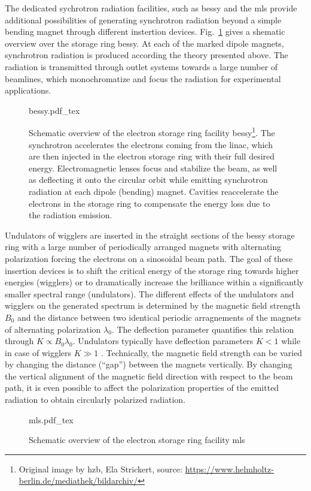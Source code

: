 The dedicated sychrotron radiation facilities, such as \gls{bessy} and the \gls{mls} provide additional possibilities of generating synchrotron radiation beyond a simple bending magnet through different instertion devices. Fig.~\ref{ch_exp:fig_bessy2} gives a shematic overview over the storage ring \gls{bessy}. At each of the marked dipole magnets, synchrotron radiation is produced according the theory presented above. The radiation is transmitted through outlet systems towards a large number of beamlines, which monochromatize and focus the radiation for experimental applications.
\begin{figure}[htb]
    \def\svgwidth{0.7\textwidth}
    {bessy.pdf_tex}
    \caption[Schematic overview of BESSY II.]{Schematic overview of the electron storage ring facility \gls{bessy}\footnote{Original image by \gls{hzb}, Ela Strickert, source: \url{https://www.helmholtz-berlin.de/mediathek/bildarchiv/}}. The synchrotron accelerates the electrons coming from the \gls{linac}, which are then injected in the electron storage ring with their full desired energy. Electromagnetic lenses focus and stabilize the beam, as well as deflecting it onto the circular orbit while emitting synchrotron radiation at each dipole (bending) magnet. Cavities reaccelerate the electrons in the storage ring to compensate the energy loss due to the radiation emission.}
    \label{ch_exp:fig_bessy2}
\end{figure}
Undulators of wigglers are inserted in the straight sections of the \gls{bessy} storage ring with a large number of periodically arranged magnets with alternating polarization forcing the electrons on a sinosoidal beam path. The goal of these insertion devices is to shift the critical energy of the storage ring towards higher energies (wigglers) or to dramatically increase the brilliance within a significantly smaller spectral range (undulators). The different effects of the undulators and wigglers on the generated spectrum is determined by the magnetic field strength $B_0$ and the distance between two identical periodic arragnements of the magnets of alternating polarization $\lambda_0$. The deflection parameter quantifies this relation through $K \propto B_0 \lambda_0$. Undulators typically have deflection parameters $K < 1$ while in case of wigglers $K \gg 1$ \cite{munro_chapter_1987}. Technically, the magnetic field strength can be varied by changing the distance (``gap'') between the magnets vertically. By changing the vertical alignment of the magnetic field direction with respect to the beam path, it is even possible to affect the polarization properties of the emitted radiation to obtain circularly polarized radiation.
\begin{figure}[htb]
    \def\svgwidth{0.7\textwidth}
    {mls.pdf_tex}
    \caption[Schematic overview of the MLS]{Schematic overview of the electron storage ring facility \gls{mls}}
    \label{ch_exp:fig_mls}
\end{figure}

